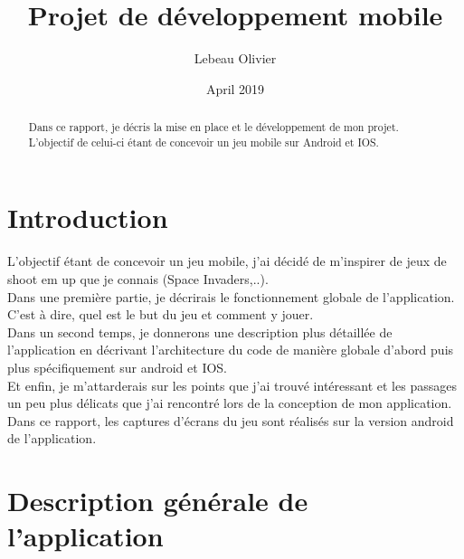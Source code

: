 \documentclass{article}
\title{Projet de développement mobile}
\author{Lebeau Olivier }
\date{April 2019}
\begin{document}
\maketitle
\begin{abstract}
Dans ce rapport, je décris la mise en place et le développement de mon projet. L'objectif de celui-ci étant de concevoir un jeu mobile sur Android et IOS.
\end{abstract}

\section{Introduction}
L'objectif étant de concevoir un jeu mobile, j'ai décidé de m'inspirer de jeux de shoot em up que je connais (Space Invaders,..).\\ 

Dans une première partie, je décrirais le fonctionnement globale de l'application. C'est à dire, quel est le but du jeu et comment y jouer. \\
Dans un second temps, je donnerons une description plus détaillée de l'application en décrivant l'architecture du code de manière globale d'abord puis plus spécifiquement sur android et IOS. \\
Et enfin, je m'attarderais sur les points que j'ai trouvé intéressant et les passages un peu plus délicats que j'ai rencontré lors de la conception de mon application. 
Dans ce rapport, les captures d'écrans du jeu sont réalisés sur la version android de l'application. \\


\tableofcontents

\newpage
\section{Description générale de l'application}
\end{document}

